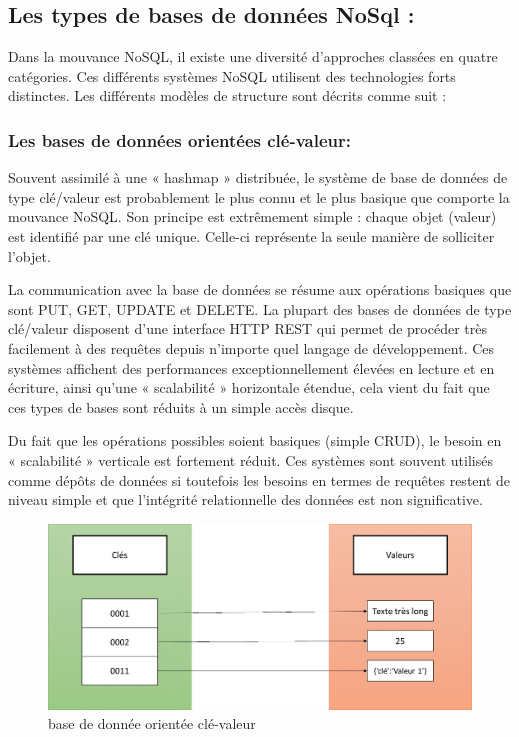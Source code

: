 \subsection{Les types de bases de données NoSql :}
Dans la mouvance NoSQL, il existe une diversité d’approches classées en quatre catégories. Ces différents systèmes NoSQL utilisent des technologies forts distinctes. Les différents modèles de structure sont décrits comme suit :

\subsubsection{Les bases de données orientées clé-valeur:}
Souvent assimilé à une « hashmap » distribuée, le système de base de données de type clé/valeur est probablement le plus connu et le plus basique que comporte la mouvance NoSQL. Son principe est extrêmement simple : chaque objet (valeur) est identifié par une clé unique. Celle-ci représente la seule manière de solliciter l’objet.

La communication avec la base de données se résume aux opérations basiques que sont PUT, GET, UPDATE et DELETE. La plupart des bases de données de type clé/valeur disposent d’une interface HTTP REST qui permet de procéder très facilement à des requêtes depuis n’importe quel langage de développement. Ces systèmes affichent des performances exceptionnellement élevées en lecture et en écriture, ainsi qu’une « scalabilité » horizontale étendue, cela vient du fait que ces types de bases sont réduits à un simple accès disque.

Du fait que les opérations possibles soient basiques (simple CRUD), le besoin en « scalabilité » verticale est fortement réduit. Ces systèmes sont souvent utilisés comme dépôts de données si toutefois les besoins en termes de requêtes restent de niveau simple et que l’intégrité relationnelle des données est non significative.

\begin{figure}[h]
	\centering
    \includegraphics[scale=0.5]{img/4.3}
    \caption{base de donnée orientée clé-valeur}
\end{figure}

